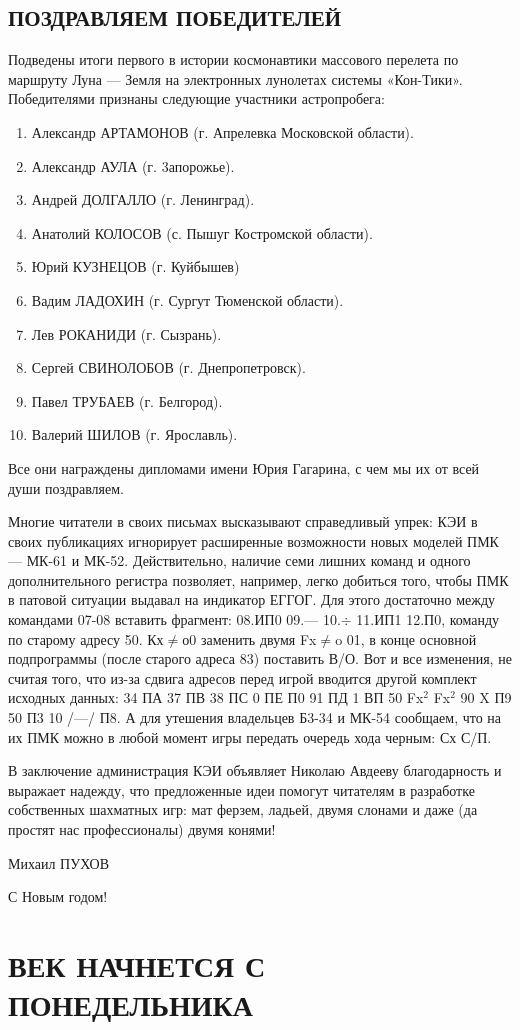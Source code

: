 \documentclass[11pt,a4paper,oneside]{article}
\begin{document}
\subsection{ПОЗДРАВЛЯЕМ ПОБЕДИТЕЛЕЙ}

Подведены итоги первого в истории космонавтики массового перелета по маршруту Луна — Земля на электронных лунолетах системы «Кон-Тики». Победителями признаны следующие участники астропробега:
\begin{enumerate}
\item Александр АРТАМОНОВ (г. Апрелевка Московской области).
\item Александр АУЛА (г. 3апорожье).
\item Андрей ДОЛГАЛЛО (г. Ленинград).
\item Анатолий КОЛОСОВ (с. Пышуг Костромской области).
\item Юрий КУЗНЕЦОВ (г. Куйбышев)
\item Вадим ЛАДОХИН (г. Сургут Тюменской области).
\item Лев РОКАНИДИ (г. Сызрань).
\item Сергей СВИНОЛОБОВ (г. Днепропетровск).
\item Павел ТРУБАЕВ (г. Белгород).
\item Валерий ШИЛОВ (г. Ярославль).
\end{enumerate}

Все они награждены дипломами имени Юрия Гагарина, с чем мы их от всей души поздравляем.

Многие читатели в своих письмах высказывают справедливый упрек: КЭИ в своих публикациях игнорирует расширенные возможности новых моделей ПМК — МК-61 и МК-52. Действительно, наличие семи лишних команд и одного дополнительного регистра позволяет, например, легко добиться того, чтобы ПМК в патовой ситуации выдавал на индикатор ЕГГОГ. Для этого достаточно между командами 07-08 вставить фрагмент: 08.ИП0 09.— 10.$\div$ 11.ИП1 12.П0, команду по старому адресу 50. Кх$\neq$о0 заменить двумя Fx$\neq$o 01, в конце основной подпрограммы (после старого адреса 83) поставить В/О. Вот и все изменения, не считая того, что из-за сдвига адресов перед игрой вводится другой комплект исходных данных: 34 ПА 37 ПВ 38 ПС 0 ПЕ П0 91 ПД 1 ВП 50 Fx$^{2}$ Fx$^{2}$ 90 X П9 50 П3 10 /—/ П8. А для утешения владельцев Б3-34 и МК-54 сообщаем, что на их ПМК можно в любой момент игры передать очередь хода черным: Сх С/П.

В заключение администрация КЭИ объявляет Николаю Авдееву благодарность и выражает надежду, что предложенные идеи помогут читателям в разработке собственных шахматных игр: мат ферзем, ладьей, двумя слонами и даже (да простят нас профессионалы) двумя конями!

Михаил ПУХОВ

С Новым годом!

\section{ВЕК НАЧНЕТСЯ С ПОНЕДЕЛЬНИКА}
\end{document}
